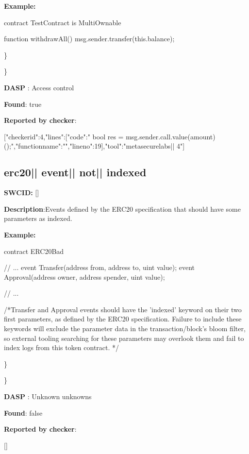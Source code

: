 \documentclass{article}
\begin{document}
\textbf{Example:} 
\begin{ffcode} 

contract TestContract is MultiOwnable {

  function withdrawAll(){
    msg.sender.transfer(this.balance);
  }
}

\end{ffcode} 
\} 

\} 

\textbf{DASP} : Access control

\textbf{Found}: true

\textbf{Reported by checker}: 
\begin{ffcode} 

[{"checker\textunderscore id":4,"lines":[{"code":"      bool res = msg.sender.call.value(amount)();\n","function\textunderscore name":"","line\textunderscore no":19}],"tool":"metasecurelabs|\textendash| 4"}]
\end{ffcode} 
\subsection{erc20{|\textunderscore| }event{|\textunderscore| }not{|\textunderscore| }indexed} 
\textbf{SWC{\textunderscore }ID:} []

\textbf{Description}:Events defined by the ERC20 specification that should have some parameters as indexed.


\textbf{Example:} 
\begin{ffcode} 

contract ERC20Bad {
    // ...
    event Transfer(address from, address to, uint value);
    event Approval(address owner, address spender, uint value);

    // ...
}

 /*Transfer and Approval events should have the 'indexed' keyword on their two first parameters, as defined by the ERC20 specification. Failure to include these keywords will exclude the parameter data in the transaction/block's bloom filter, so external tooling searching for these parameters may overlook them and fail to index logs from this token contract. */ 

\end{ffcode} 
\} 

\} 

\textbf{DASP} : Unknown unknowns

\textbf{Found}: false

\textbf{Reported by checker}: 
\begin{ffcode} 

[]
\end{ffcode} 
\end{document}
